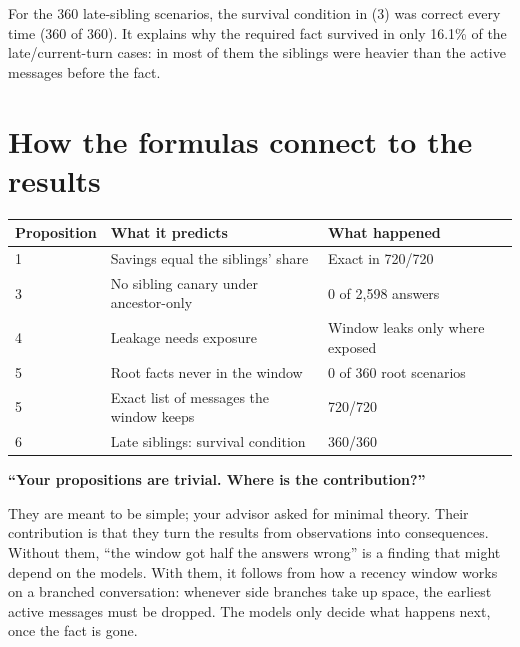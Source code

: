 \begin{example}
For the 360 late-sibling scenarios, the survival condition in (3) was correct every time (360 of 360). It explains why the required fact survived in only 16.1\% of the late/current-turn cases: in most of them the siblings were heavier than the active messages before the fact.
\end{example}

\section{How the formulas connect to the results}

\begin{center}
\small
\begin{tabularx}{\textwidth}{@{}lXl@{}}
\toprule
Proposition & What it predicts & What happened \\
\midrule
1 & Savings equal the siblings' share & Exact in 720/720 \\
3 & No sibling canary under ancestor-only & 0 of 2,598 answers \\
4 & Leakage needs exposure & Window leaks only where exposed \\
5 & Root facts never in the window & 0 of 360 root scenarios \\
5 & Exact list of messages the window keeps & 720/720 \\
6 & Late siblings: survival condition & 360/360 \\
\bottomrule
\end{tabularx}
\end{center}

\begin{ask}
\textbf{``Your propositions are trivial. Where is the contribution?''}\par
They are meant to be simple; your advisor asked for minimal theory. Their contribution is that they turn the results from observations into consequences. Without them, ``the window got half the answers wrong'' is a finding that might depend on the models. With them, it follows from how a recency window works on a branched conversation: whenever side branches take up space, the earliest active messages must be dropped. The models only decide what happens next, once the fact is gone.
\end{ask}
